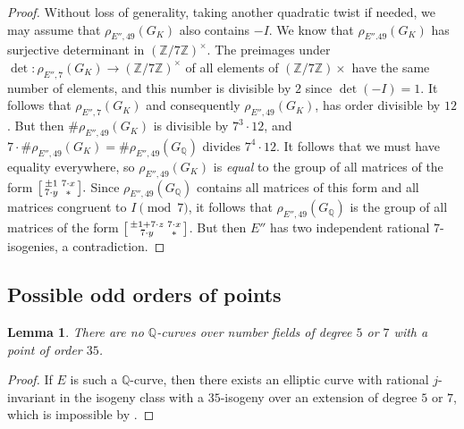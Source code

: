 \documentclass[10pt,leqno]{amsart}
\newcommand\sm[1]{\begin{bsmallmatrix}#1\end{bsmallmatrix}}
\newcommand{\Z}{\mathbb{Z}}
\newcommand{\Q}{\mathbb{Q}}
\newtheorem{lemma}[theorem]{Lemma}
\theoremstyle{definition}
\theoremstyle{remark}
\numberwithin{theorem}{section}
\begin{document}
\begin{proof}
    Without loss of generality, taking another quadratic twist if needed, we may assume that $\rho_{E'', 49}(G_K)$ also contains $-I$. We know that $\rho_{E''. 49}(G_K)$ has surjective determinant in $(\Z/7\Z)^\times$. The preimages under $\det: \rho_{E'', 7}(G_K) \to (\Z/7\Z)^\times$ of all elements of $(\Z/7\Z)\times$ have the same number of elements, and this number is divisible by $2$ since $\det(-I)=1$.  It follows that $\rho_{E'', 7}(G_K)$ and consequently $\rho_{E'', 49}(G_K)$, has order divisible by $12$. But then  $\#\rho_{E'', 49}(G_K)$ is divisible by $7^3 \cdot 12$, and $7\cdot\#\rho_{E'', 49}(G_K)=\#\rho_{E'', 49}(G_\Q)$ divides $7^4\cdot 12$. It follows that we must have equality everywhere, so $\rho_{E'', 49}(G_K)$ is \emph{equal} to the group of all matrices of the form $\sm{\pm 1 & 7\cdot x \\ 7\cdot y & *}.$ Since $\rho_{E'', 49}(G_\Q)$ contains all matrices of this form and all matrices congruent to $I \pmod 7$, it follows that $\rho_{E'', 49}(G_\Q)$ is the group of all matrices of the form $\sm{\pm 1+7\cdot z & 7\cdot x \\ 7\cdot y & *}$. But then $E''$ has two independent rational $7$-isogenies, a contradiction. 
\end{proof}

\subsection{Possible odd orders of points}

\begin{lemma}
    There are no $\Q$-curves over number fields of degree $5$ or $7$ with a point of order $35$.
\end{lemma}

\begin{proof}
    If $E$ is such a $\Q$-curve, then there exists an elliptic curve with rational $j$-invariant in the isogeny class with a $35$-isogeny over an extension of degree $5$ or $7$, which is impossible by \cite[Theorem 1.3]{ja}.
\end{proof}
\end{document}
